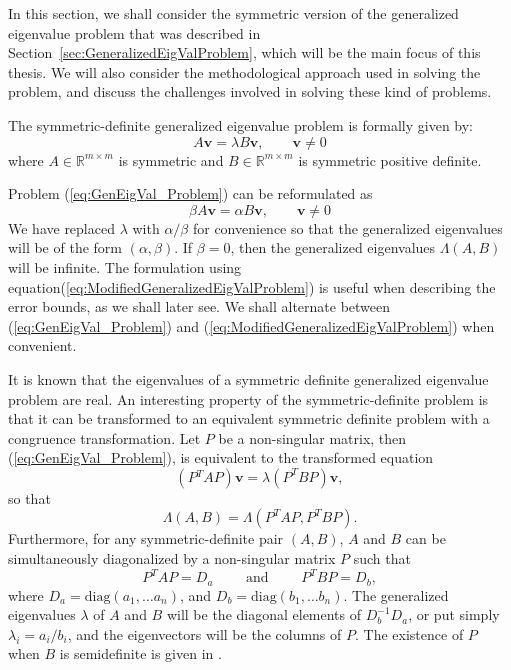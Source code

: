 In this section, we shall consider the symmetric version of the generalized eigenvalue problem that was described in Section~\ref{sec:GeneralizedEigValProblem}, which will be the main focus of this thesis. We will also consider the methodological approach used in solving the problem, and discuss the challenges involved in solving these kind of problems.

The symmetric-definite generalized eigenvalue problem is formally given by:
\begin{equation}\label{eq:GenEigVal_Problem}
	A\mathbf{v} = \lambda B\mathbf{v}, \qquad \mathbf{v} \neq 0
\end{equation}
where $A \in \mathbb{R}^{m \times m}$ is symmetric and $B \in \mathbb{R}^{m \times m}$ is symmetric positive definite.

Problem (\ref{eq:GenEigVal_Problem}) can be reformulated  as
\begin{equation}\label{eq:ModifiedGeneralizedEigValProblem}
	\beta A\mathbf{v} = \alpha B\mathbf{v}, \qquad \mathbf{v} \neq 0
\end{equation}
We have replaced $\lambda$ with $\alpha/\beta$ for convenience so that the generalized eigenvalues will be of the form $(\alpha, \beta)$. If $ \beta = 0$, then the generalized eigenvalues $\Lambda(A, B)$ will be infinite. The formulation using equation(\ref{eq:ModifiedGeneralizedEigValProblem}) is useful when describing the error bounds, as we shall later see. We shall alternate between (\ref{eq:GenEigVal_Problem}) and (\ref{eq:ModifiedGeneralizedEigValProblem}) when convenient.

It is known that the eigenvalues of a symmetric definite generalized eigenvalue problem are real. An interesting property of the symmetric-definite problem is that it can be transformed to an equivalent symmetric definite problem with a congruence transformation. Let $P$ be a non-singular matrix, then (\ref{eq:GenEigVal_Problem}), is equivalent to the transformed equation
\begin{equation}\label{eq:CongruenceTransGenEigVal}
	(P{^T}AP) \mathbf{v}= \lambda (P^{T}BP) \mathbf{v},
\end{equation}
so that
\begin{equation}\label{eq:EquivalenceOfEigVals}
	\Lambda(A, B) = \Lambda(P^{T}AP, P^{T}BP).
\end{equation}
Furthermore, for any symmetric-definite pair $(A, B)$, $A$ and $B$ can be simultaneously diagonalized by a non-singular matrix $P$ such that
\begin{equation}\label{eq:SimultaneousDiag}
	P^{T}AP = D_a \qquad \text{ and } \qquad P^TBP = D_b,
\end{equation}
where $D_a = \text{diag}(a_1, \ldots a_n) $, and $D_b = \text{diag}(b_1, \ldots b_n) $. The generalized eigenvalues $\lambda$ of $A$ and $B$ will be the diagonal elements of $D^{-1}_bD_a$, or put simply $\lambda_i = a_i/b_i$, and the eigenvectors will be the columns of $P$. The existence of $P$ when $B$ is semidefinite is given in \cite[p.~498]{doi:10.1137/1.9781421407944}.

